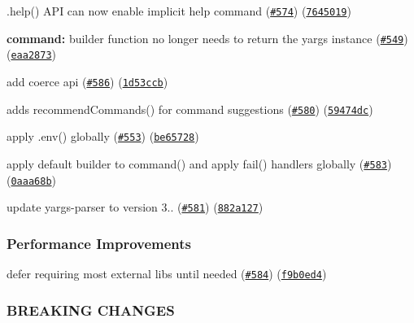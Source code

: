 \begin{DoxyItemize}
\item .help() A\+PI can now enable implicit help command (\href{https://github.com/yargs/yargs/issues/574}{\tt \#574}) (\href{https://github.com/yargs/yargs/commit/7645019}{\tt 7645019})
\item {\bfseries command\+:} builder function no longer needs to return the yargs instance (\href{https://github.com/yargs/yargs/issues/549}{\tt \#549}) (\href{https://github.com/yargs/yargs/commit/eaa2873}{\tt eaa2873})
\item add coerce api (\href{https://github.com/yargs/yargs/issues/586}{\tt \#586}) (\href{https://github.com/yargs/yargs/commit/1d53ccb}{\tt 1d53ccb})
\item adds recommend\+Commands() for command suggestions (\href{https://github.com/yargs/yargs/issues/580}{\tt \#580}) (\href{https://github.com/yargs/yargs/commit/59474dc}{\tt 59474dc})
\item apply .env() globally (\href{https://github.com/yargs/yargs/issues/553}{\tt \#553}) (\href{https://github.com/yargs/yargs/commit/be65728}{\tt be65728})
\item apply default builder to command() and apply fail() handlers globally (\href{https://github.com/yargs/yargs/issues/583}{\tt \#583}) (\href{https://github.com/yargs/yargs/commit/0aaa68b}{\tt 0aaa68b})
\item update yargs-\/parser to version 3.. (\href{https://github.com/yargs/yargs/issues/581}{\tt \#581}) (\href{https://github.com/yargs/yargs/commit/882a127}{\tt 882a127})
\end{DoxyItemize}

\subsubsection*{Performance Improvements}


\begin{DoxyItemize}
\item defer requiring most external libs until needed (\href{https://github.com/yargs/yargs/issues/584}{\tt \#584}) (\href{https://github.com/yargs/yargs/commit/f9b0ed4}{\tt f9b0ed4})
\end{DoxyItemize}

\subsubsection*{B\+R\+E\+A\+K\+I\+NG C\+H\+A\+N\+G\+ES}


